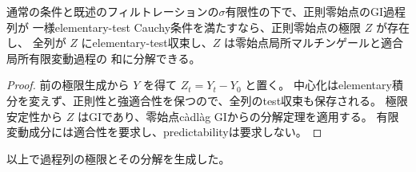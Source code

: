 \begin{corollary}[分解可能な領域に属するCauchy極限]
通常の条件と既述のフィルトレーションの$\sigma$有限性の下で、正則零始点のGI過程列が
一様elementary-test Cauchy条件を満たすなら、正則零始点の極限 $Z$ が存在し、
全列が $Z$ にelementary-test収束し、$Z$ は零始点局所マルチンゲールと適合局所有限変動過程の
和に分解できる。
\end{corollary}
\begin{proof}
前の極限生成から $Y$ を得て $Z_t=Y_t-Y_0$ と置く。
中心化はelementary積分を変えず、正則性と強適合性を保つので、全列のtest収束も保存される。
極限安定性から $Z$ はGIであり、零始点càdlàg GIからの分解定理を適用する。
有限変動成分には適合性を要求し、predictabilityは要求しない。
\end{proof}
以上で過程列の極限とその分解を生成した。

